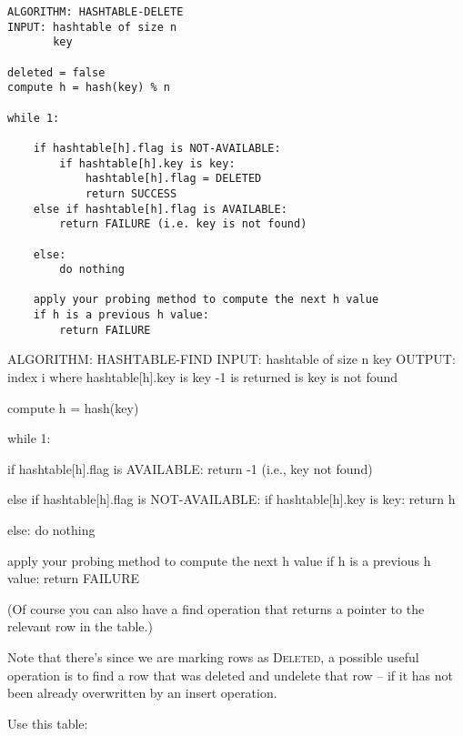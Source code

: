 \begin{Verbatim}[frame=single]
ALGORITHM: HASHTABLE-DELETE
INPUT: hashtable of size n
       key

deleted = false
compute h = hash(key) % n

while 1:
    
    if hashtable[h].flag is NOT-AVAILABLE:
        if hashtable[h].key is key:
            hashtable[h].flag = DELETED
            return SUCCESS
    else if hashtable[h].flag is AVAILABLE:
        return FAILURE (i.e. key is not found)

    else:
        do nothing

    apply your probing method to compute the next h value
    if h is a previous h value:
        return FAILURE
\end{Verbatim}


\begin{console}
ALGORITHM: HASHTABLE-FIND
INPUT: hashtable of size n
       key
OUTPUT: index i where hashtable[h].key is key
            -1 is returned is key is not found

compute h = hash(key) %

while 1:

    if hashtable[h].flag is AVAILABLE:
        return -1 (i.e., key not found)

    else if hashtable[h].flag is NOT-AVAILABLE:
        if hashtable[h].key is key:
            return h
            
    else:
        do nothing
        
    apply your probing method to compute the next h value
    if h is a previous h value:
        return FAILURE
\end{console}
(Of course you can also have a find operation that returns a pointer
to the relevant row in the table.)

Note that there's since we are marking rows as \textsc{Deleted},
a possible useful operation is to find a row that was deleted
and undelete that row -- if it has not been already overwritten
by an insert operation.



Use this table:


